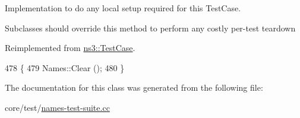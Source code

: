 Implementation to do any local setup required for this Test\+Case. 

Subclasses should override this method to perform any costly per-\/test teardown 

Reimplemented from \hyperlink{classns3_1_1TestCase_a8917f1604e28d312a8086f76291e3c46}{ns3\+::\+Test\+Case}.


\begin{DoxyCode}
478 \{
479   Names::Clear ();
480 \}
\end{DoxyCode}


The documentation for this class was generated from the following file\+:\begin{DoxyCompactItemize}
\item 
core/test/\hyperlink{names-test-suite_8cc}{names-\/test-\/suite.\+cc}\end{DoxyCompactItemize}
